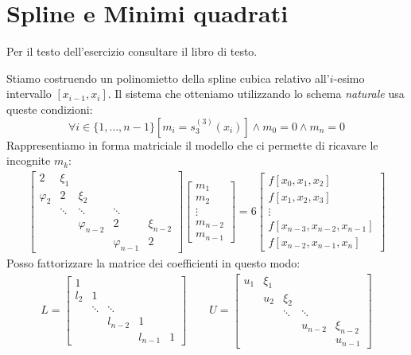 \section{Spline e Minimi quadrati}

\begin{exercise}[4.16] 
Per il testo dell'esercizio consultare il libro di testo.
\end{exercise} 
Stiamo costruendo un polinomietto della spline cubica relativo all'$i$-esimo
intervallo $[x_{i-1}, x_{i}]$. Il sistema che otteniamo utilizzando lo schema 
\emph{naturale} usa queste condizioni:
\begin{displaymath}
	\forall i \in \{1,\ldots, n-1\}[m_{i} = s_{3}^{(3)}(x_{i})] \wedge m_{0} = 0
	\wedge m_{n} = 0
\end{displaymath}
Rappresentiamo in forma matriciale il modello che ci permette di ricavare le
incognite $m_{k}$:
\begin{displaymath}
\begin{split}
	\begin{bmatrix}
		2 & \xi_{1} \\
		\varphi_{2} & 2 & \xi_{2} \\
			&	\ddots &	\ddots & \ddots \\
			&	&	\varphi_{n-2} & 2 & \xi_{n-2} \\
			&	&	& \varphi_{n-1} & 2
	\end{bmatrix} %
	\begin{bmatrix}
		m_{1} \\
		m_{2} \\
		\vdots \\
		m_{n-2} \\
		m_{n-1}
	\end{bmatrix} = 6 %
	\begin{bmatrix}
		f[x_{0}, x_{1}, x_{2}] \\
		f[x_{1}, x_{2}, x_{3}] \\
		\vdots \\
		f[x_{n-3}, x_{n-2}, x_{n-1}] \\
		f[x_{n-2}, x_{n-1}, x_{n}]
	\end{bmatrix} 
\end{split}
\end{displaymath}
Posso fattorizzare la matrice dei coefficienti in questo modo:
\begin{displaymath}
\begin{split}
	L = \begin{bmatrix}
		1 \\
		l_{2} & 1  \\
			&	\ddots &	\ddots \\
			&	&	l_{n-2} & 1 \\
			&	&	& l_{n-1} & 1
	\end{bmatrix} \quad \quad
	U = \begin{bmatrix}
		u_{1} & \xi_{1}\\
		 & u_{2} & \xi_{2} \\
			&	&	\ddots	& \ddots \\
			&	&	& u_{n-2}	& \xi_{n-2} \\
			&	&	&  & u_{n-1}
	\end{bmatrix} 
\end{split}
\end{displaymath}
